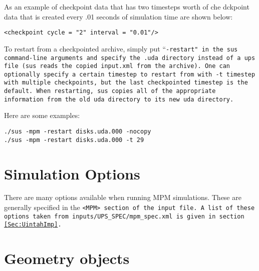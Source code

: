 As an example of checkpoint data that has two timesteps worth of
che dckpoint data that is created every .01 seconds of simulation time
are shown below:

\begin{Verbatim}[fontsize=\footnotesize]
<checkpoint cycle = "2" interval = "0.01"/>
\end{Verbatim}

To restart from a checkpointed archive, simply put ``\tt -restart\normalfont" in the
sus command-line arguments and specify the .uda directory instead of
a ups file (sus reads the copied \tt input.xml \normalfont from the
archive).  One can optionally specify a certain timestep to restart
from with \tt -t timestep \normalfont with multiple checkpoints, but the
last checkpointed timestep is the default.  When restarting, sus
copies all of the appropriate information from the old uda directory to its
new uda directory.

Here are some examples:

\begin{Verbatim}[fontsize=\footnotesize]
./sus -mpm -restart disks.uda.000 -nocopy
./sus -mpm -restart disks.uda.000 -t 29
\end{Verbatim}
%

\section{Simulation Options} \label{Sec:SimulationOptions}


There are many options available when running MPM simulations.  These
are generally specified in the \tt <MPM> \normalfont section of the input file.
A list of these options taken from
\tt inputs/UPS\_SPEC/mpm\_spec.xml \normalfont  is given in section \ref{Sec:UintahImp}.

\section{Geometry objects} \label{Sec:GeometryObjects}

